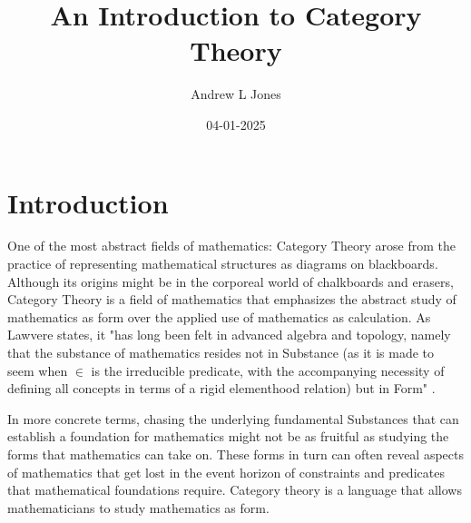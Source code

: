 \documentclass{article}
\title{An Introduction to Category Theory}
\author{Andrew L Jones}\date{04-01-2025}
\begin{document}
\maketitle


\section*{Introduction}
One of the most abstract fields of mathematics: Category Theory arose from the practice of representing mathematical structures as diagrams on blackboards. Although its origins might be in the corporeal world of chalkboards and erasers, Category Theory is a field of mathematics that emphasizes the abstract study of mathematics as form over the applied use of mathematics as calculation. As Lawvere states, it "has long been felt in advanced algebra and topology, namely that the substance of mathematics resides not in Substance (as it is made to seem when $\in$ is the irreducible predicate, with the accompanying necessity of defining all concepts in terms of a rigid elementhood relation) but in Form" \cite{Lawvere01}. 

In more concrete terms, chasing the underlying fundamental Substances that can establish a foundation for mathematics might not be as fruitful as studying the forms that mathematics can take on. These forms in turn can often reveal aspects of mathematics that get lost in the event horizon of constraints and predicates that mathematical foundations require. Category theory is a language that allows mathematicians to study mathematics as form.

\end{document}
